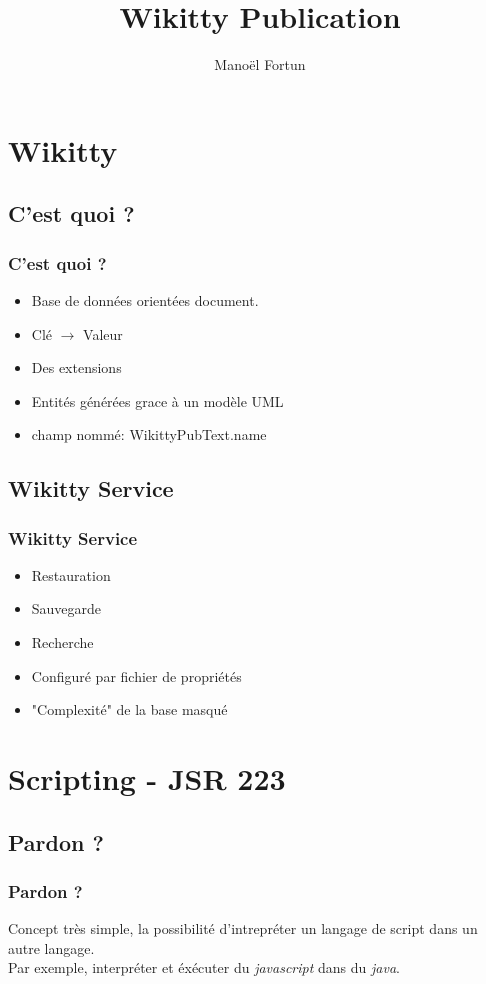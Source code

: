 \documentclass[12pt,a4paper,utf8x]{beamer}
\begin{document}
\title{Wikitty Publication}  
\author{Manoël Fortun}

\begin{frame}
\titlepage
\end{frame}

\begin{frame}\tableofcontents	
\end{frame} 


\section{Wikitty} 
\subsection{C'est quoi ?}
\begin{frame}\frametitle{C'est quoi ?} 
\begin{itemize}
\item Base de données orientées document.
\item Clé $\to$ Valeur 
\item Des extensions
\item Entités générées grace à un modèle UML
\item champ nommé: WikittyPubText.name
\end{itemize}
\end{frame}

\subsection{Wikitty Service}
\begin{frame} \frametitle{Wikitty Service} 
\begin{itemize}
\item Restauration 
\item Sauvegarde
\item Recherche
\item Configuré par fichier de propriétés
\item "Complexité" de la base masqué
\end{itemize}
\end{frame}


\section{Scripting - JSR 223}
\subsection{Pardon ?}
\begin{frame}\frametitle{Pardon ?}
Concept très simple, la possibilité d'intrepréter un langage de script dans un
autre langage.\\

Par exemple, interpréter et éxécuter du \emph{javascript} dans du \emph{java}.
\end{frame}
\end{document}
